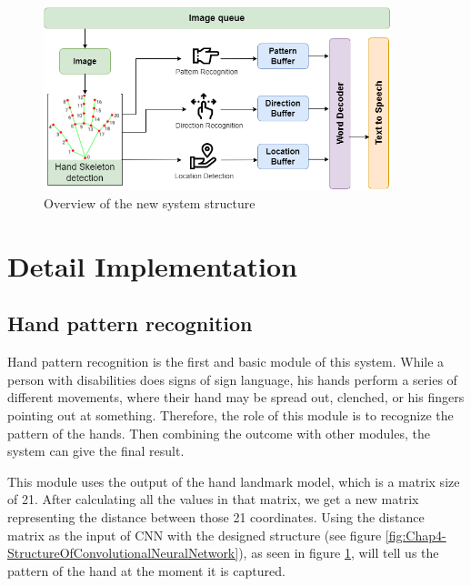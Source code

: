 \begin{figure}[H]
	\centering
	\includegraphics[width=0.9\textwidth]{img/Chap4/OverviewOfTheSystemModules-New.png}
	\caption{Overview of the new system structure}
	\label{fig:Chap4-OverviewOfTheSystemModules-New}
\end{figure}

\section{Detail Implementation}\label{sec:DetailImplementation}

\subsection{Hand pattern recognition}

Hand pattern recognition is the first and basic module of this system. While a person with disabilities does signs of sign language, his hands perform a series of different movements, where their hand may be spread out, clenched, or his fingers pointing out at something. Therefore, the role of this module is to recognize the pattern of the hands. Then combining the outcome with other modules, the system can give the final result.

This module uses the output of the hand landmark model, which is a matrix size of 21. After calculating all the values in that matrix, we get a new matrix representing the distance between those 21 coordinates. Using the distance matrix as the input of CNN with the designed structure (see figure \ref{fig:Chap4-StructureOfConvolutionalNeuralNetwork}), as seen in figure \ref{fig:Chap4-OverviewOfTheSystemModules-New}, will tell us the pattern of the hand at the moment it is captured.

